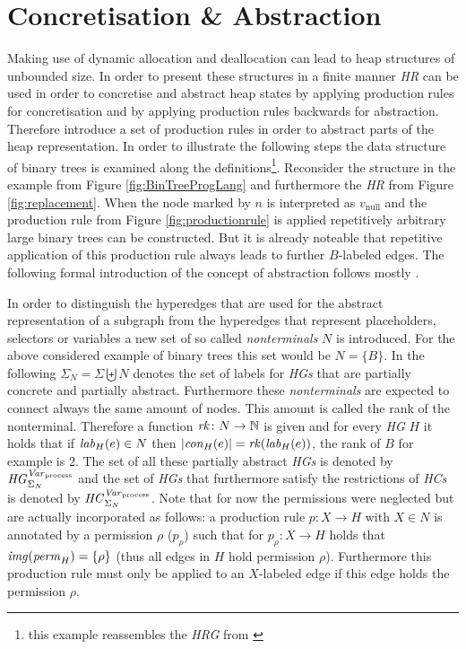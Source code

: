 \section{Concretisation \& Abstraction}
	Making use of dynamic allocation and deallocation can lead to heap
	structures of unbounded size. In order to present these structures in a
	finite manner \emph{\ac{HR}} can be used in order to concretise and abstract
	heap states by applying production rules for concretisation and by applying
	production rules backwards for abstraction. Therefore introduce a set of
	production rules in order to abstract parts of the heap representation.
	In order to illustrate the
	following steps the data structure of binary trees is examined along the
	definitions\footnote{this example reassembles the \emph{\acl*{HRG}} from
	\cite[p. 21]{fmsd}}. Reconsider the structure in the example from Figure
	\ref{fig:BinTreeProgLang} and furthermore the \emph{\ac{HR}} from Figure
	\ref{fig:replacement}. When the node marked by $n$ is interpreted as
	$v_{\text{null}}$ and the production rule from Figure
	\ref{fig:productionrule} is applied repetitively arbitrary large binary
	trees can be constructed. But it is already noteable that repetitive
	application of this production rule always leads to further $B$-labeled
	edges. The following formal introduction of the concept of abstraction
	follows mostly \cites{fmsd}{InductivePredicates}{LocalGreibachNormalForm}.

	In order to distinguish the hyperedges that are used for the abstract
	representation of a subgraph from the hyperedges that represent
	placeholders, selectors or variables a new set of so called
	\emph{nonterminals} $N$ is introduced. For the above considered example of
	binary trees this set would be $N=\{B\}$. In the following
	$\Sigma_{N} = \Sigma\biguplus N$ denotes the set of labels for
	\emph{\acp{HG}} that are partially concrete and partially abstract.
	Furthermore these \emph{nonterminals} are expected to connect always the
	same amount of nodes. This amount is called the rank of the nonterminal.
	Therefore a function $\mathit{rk}\colon N\rightarrow \mathbb{N}$ is given and for
	every \emph{\ac{HG}} $H$ it holds that if $\mathit{lab}_{H}(e)\in N$ then
	$|\mathit{con}_{H}(e)|=\mathit{rk}(\mathit{lab}_{H}(e))$, the rank of $B$ for example is $2$.
	The set of all these partially abstract \emph{\acp{HG}} is denoted by $\mathit{HG}_{\Sigma_{N}}^{\mathit{Var}_{\text{process}}}$
	and the set of \emph{\acp{HG}} that furthermore satisfy the restrictions of
	\emph{\acp{HC}} is denoted by $\mathit{HC}_{\Sigma_{N}}^{\mathit{Var}_{\text{process}}}$. Note that for now the permissions were
	neglected but are actually incorporated as follows: a production rule
	$p\colon X\rightarrow H$ with $X\in N$ is annotated by
	a permission $\rho$ ($p_{\rho}$) such that for
	$p_{\rho}\colon X\rightarrow H$
	holds that $\mathit{img}(\mathit{perm}_{H}) = \{\rho\}$ (thus all edges in $H$ hold
	permission $\rho$). Furthermore this production rule must only be applied to
	an $X$-labeled edge if this edge holds the permission $\rho$.

